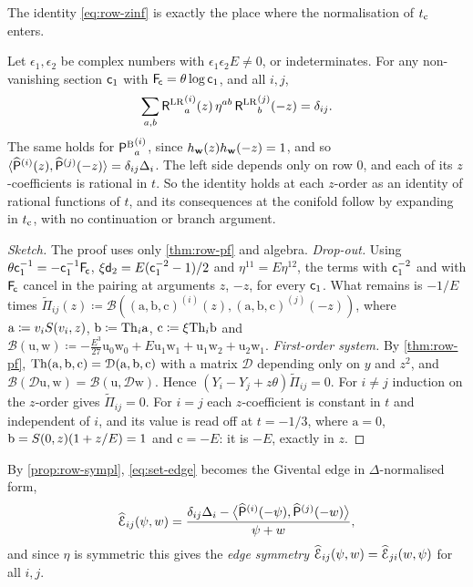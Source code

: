 The identity \eqref{eq:row-zinf} is exactly the place where the normalisation of $t_{\mathrm{c}}$ enters.

\begin{prop}
\label{prop:row-sympl}
Let $\epsilon_1,\epsilon_2$ be complex numbers with $\epsilon_1\epsilon_2E\neq0$, or indeterminates. For any non-vanishing section $\mathsf{c}_{1}$ with $\mathsf{F}_{\!\mathsf{c}}=\theta\log\mathsf{c}_{1}$, and all $i,j$,
\[
\sum_{a,b}{\mathsf{R}^{\mathrm{LR}}}_a^{(i)}(z)\,\eta^{ab}\,{\mathsf{R}^{\mathrm{LR}}}_b^{(j)}(-z)=\delta_{ij}.
\]
The same holds for ${\mathsf{P}^{\mathrm{B}}}_a^{(i)}$, since $h_{\mathbf{w}}(z)h_{\mathbf{w}}(-z)=1$, and so $\langle\widehat{\mathsf{P}}^{(i)}(z),\widehat{\mathsf{P}}^{(j)}(-z)\rangle=\delta_{ij}\Delta_i$. The left side depends only on row $0$, and each of its $z$-coefficients is rational in $t$. So the identity holds at each $z$-order as an identity of rational functions of $t$, and its consequences at the conifold follow by expanding in $t_{\mathrm{c}}$, with no continuation or branch argument.
\end{prop}

\begin{proof}[Sketch]
The proof uses only \cref{thm:row-pf} and algebra. \emph{Drop-out.} Using $\theta\mathsf{c}_{1}^{-1}=-\mathsf{c}_{1}^{-1}\mathsf{F}_{\!\mathsf{c}}$, $\xi\mathsf{d}_{2}=E(\mathsf{c}_{1}^{-2}-1)/2$ and $\eta^{11}=E\eta^{12}$, the terms with $\mathsf{c}_{1}^{-2}$ and with $\mathsf{F}_{\!\mathsf{c}}$ cancel in the pairing at arguments $z$, $-z$, for every $\mathsf{c}_{1}$. What remains is $-1/E$ times $\widetilde\Pi_{ij}(z)\coloneqq\mathscr{B}((\mathrm{a},\mathrm{b},\mathrm{c})^{(i)}(z),(\mathrm{a},\mathrm{b},\mathrm{c})^{(j)}(-z))$, where $\mathrm{a}\coloneqq v_iS(v_i,z)$, $\mathrm{b}\coloneqq\mathrm{Th}_i\mathrm{a}$, $\mathrm{c}\coloneqq\xi\mathrm{Th}_i\mathrm{b}$ and $\mathscr{B}(\mathrm{u},\mathrm{w})\coloneqq-\frac{E^3}{27}\mathrm{u}_0\mathrm{w}_0+E\mathrm{u}_1\mathrm{w}_1+\mathrm{u}_1\mathrm{w}_2+\mathrm{u}_2\mathrm{w}_1$. \emph{First-order system.} By \cref{thm:row-pf}, $\mathrm{Th}(\mathrm{a},\mathrm{b},\mathrm{c})=\mathcal{D}(\mathrm{a},\mathrm{b},\mathrm{c})$ with a matrix $\mathcal{D}$ depending only on $y$ and $z^2$, and $\mathscr{B}(\mathcal{D}\mathrm{u},\mathrm{w})=\mathscr{B}(\mathrm{u},\mathcal{D}\mathrm{w})$. Hence $(Y_i-Y_j+z\theta)\widetilde\Pi_{ij}=0$. For $i\neq j$ induction on the $z$-order gives $\widetilde\Pi_{ij}=0$. For $i=j$ each $z$-coefficient is constant in $t$ and independent of $i$, and its value is read off at $t=-1/3$, where $\mathrm{a}=0$, $\mathrm{b}=S(0,z)(1+z/E)=1$ and $\mathrm{c}=-E$: it is $-E$, exactly in $z$.
\end{proof}

By \cref{prop:row-sympl}, \eqref{eq:set-edge} becomes the Givental edge in $\Delta$-normalised form,
\begin{equation}
\label{eq:row-edgedelta}
\widehat{\mathcal{E}}_{ij}(\psi,w)=\frac{\delta_{ij}\Delta_i-\big\langle\widehat{\mathsf{P}}^{(i)}(-\psi),\widehat{\mathsf{P}}^{(j)}(-w)\big\rangle}{\psi+w},
\end{equation}
and since $\eta$ is symmetric this gives the \emph{edge symmetry} $\widehat{\mathcal{E}}_{ij}(\psi,w)=\widehat{\mathcal{E}}_{ji}(w,\psi)$ for all $i,j$.

